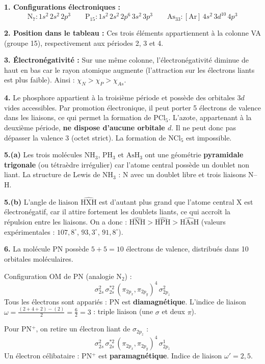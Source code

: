 \documentclass[12pt,a4paper]{article}
\begin{document}
\begin{boitecorrige}
\textbf{1. Configurations électroniques :}
\[
\text{N}_{7} : 1s^{2}\,2s^{2}\,2p^{3} \qquad \text{P}_{15} : 1s^{2}\,2s^{2}\,2p^{6}\,3s^{2}\,3p^{3} \qquad \text{As}_{33} : [\text{Ar}]\,4s^{2}\,3d^{10}\,4p^{3}
\]

\textbf{2. Position dans le tableau :} Ces trois éléments appartiennent à la colonne VA (groupe 15), respectivement aux périodes 2, 3 et 4.

\textbf{3. Électronégativité :} Sur une même colonne, l'électronégativité diminue de haut en bas car le rayon atomique augmente (l'attraction sur les électrons liants est plus faible). Ainsi : $\chi_N > \chi_P > \chi_{As}$.

\textbf{4.} Le phosphore appartient à la troisième période et possède des orbitales $3d$ vides accessibles. Par promotion électronique, il peut porter 5 électrons de valence dans les liaisons, ce qui permet la formation de $\text{PCl}_5$. L'azote, appartenant à la deuxième période, \textbf{ne dispose d'aucune orbitale $d$}. Il ne peut donc pas dépasser la valence 3 (octet strict). La formation de $\text{NCl}_5$ est impossible.

\textbf{5.(a)} Les trois molécules $\text{NH}_3$, $\text{PH}_3$ et $\text{AsH}_3$ ont une géométrie \textbf{pyramidale trigonale} (ou tétraèdre irrégulier) car l'atome central possède un doublet non liant. La structure de Lewis de $\text{NH}_3$ : N avec un doublet libre et trois liaisons N--H.

\textbf{5.(b)} L'angle de liaison $\widehat{\text{HXH}}$ est d'autant plus grand que l'atome central X est électronégatif, car il attire fortement les doublets liants, ce qui accroît la répulsion entre les liaisons. On a donc : $\widehat{\text{HNH}} > \widehat{\text{HPH}} > \widehat{\text{HAsH}}$ (valeurs expérimentales : $107{,}8^\circ $, $93{,}3^\circ $, $91{,}8^\circ $).

\textbf{6.} La molécule PN possède $5 + 5 = 10$ électrons de valence, distribués dans 10 orbitales moléculaires.

Configuration OM de PN (analogie N$_2$) :
\[
\sigma_{2s}^{2}\,\sigma^{*2}_{2s}\,(\pi_{2p_x},\pi_{2p_y})^{4}\,\sigma_{2p_z}^{2}
\]
Tous les électrons sont appariés : PN est \textbf{diamagnétique}. L'indice de liaison $\omega = \frac{(2+4+2)-(2)}{2} = \frac{6}{2} = 3$ : triple liaison (une $\sigma$ et deux $\pi$).

Pour PN$^+$, on retire un électron liant de $\sigma_{2p_z}$ :
\[
\sigma_{2s}^{2}\,\sigma^{*2}_{2s}\,(\pi_{2p_x},\pi_{2p_y})^{4}\,\sigma_{2p_z}^{1}
\]
Un électron célibataire : PN$^+$ est \textbf{paramagnétique}. Indice de liaison $\omega' = 2{,}5$.
\end{boitecorrige}
\end{document}
